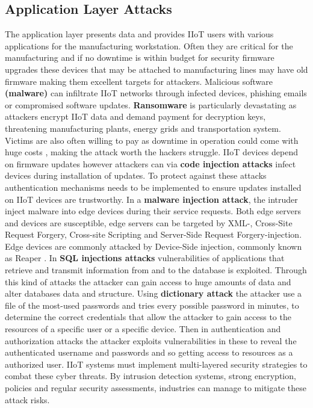 \documentclass[article,a4paper]{IEEEtran}
\begin{document}
\subsection{Application Layer Attacks}
The application layer presents data and provides IIoT users with various applications for the manufacturing workstation. Often they are critical for the manufacturing and if no downtime is within budget for security firmware upgrades these devices that may be attached to manufacturing lines may have old firmware making them excellent targets for attackers.
\newline\newline   
Malicious software \textbf{(malware)} can infiltrate IIoT networks through infected devices, phishing emails or compromised software updates. \textbf{Ransomware} is particularly devastating as attackers encrypt IIoT data and demand payment for decryption keys, threatening manufacturing plants, energy grids and transportation system. Victims are also often willing to pay as downtime in operation could come with huge costs \cite{SurveySecurity}, making the attack worth the hackers struggle.  
\newline
IIoT devices depend on firmware updates however attackers can via \textbf{code injection attacks} infect devices during installation of updates. To protect against these attacks authentication mechanisms needs to be implemented to ensure updates installed on IIoT devices are trustworthy. 
\newline
In a \textbf{malware injection attack}, the intruder inject malware into edge devices during their service requests. Both edge servers and devices are susceptible, edge servers can be targeted by XML-, Cross-Site Request Forgery, Cross-site Scripting and Server-Side Request Forgery-injection. Edge devices are commonly attacked by Device-Side injection, commonly known as Reaper \cite{SurveySecurity}.
\newline 
In \textbf{SQL injections attacks} vulnerabilities of applications that retrieve and transmit information from and to the database is exploited. Through this kind of attacks the attacker can gain access to huge amounts of data and alter databases data and structure. 
\newline
Using \textbf{dictionary attack} the attacker use a file of the most-used passwords and tries every possible password in minutes, to determine the correct credentials that allow the attacker to gain access to the resources of a specific user or a specific device. Then in authentication and authorization attacks the attacker exploits vulnerabilities in these to reveal the authenticated username and passwords and so getting access to resources as a authorized user.
\newline\newline
IIoT systems must implement multi-layered security strategies to combat these cyber threats. By intrusion detection systems, strong encryption, policies and regular security assessments, industries can manage to mitigate these attack risks.
\end{document}
